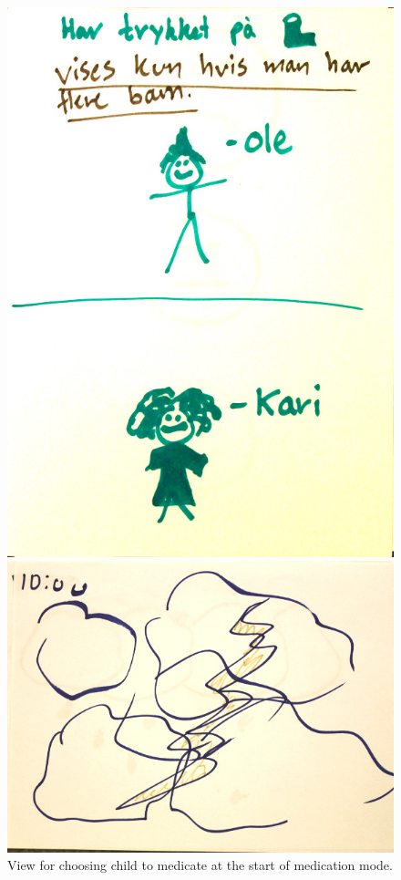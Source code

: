 \begin{figure}
	\begin{minipage}[b]{0.46\linewidth}
		\centering
			\includegraphics[width=0.34\paperwidth]{Pictures/DesignWorkshop/MedicationViewPickChild}
		\caption[Pick child view from design workshop]{View for choosing child to medicate at the start of medication mode.}
		\label{fig:dwPickChild}
	\end{minipage}
	\hspace{1cm}
	\begin{minipage}[b]{0.46\linewidth}
		\centering
		\includegraphics[width=0.34\paperwidth]{Pictures/DesignWorkshop/MedicationViewCloudsThunderstorm}

\end{minipage}
\end{figure}
